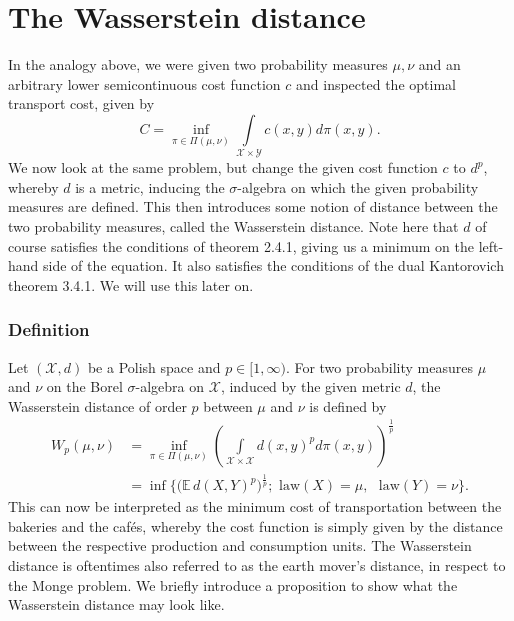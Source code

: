 \documentclass[11pt,a4paper]{article}
\begin{document}
\section{The Wasserstein distance}
In the analogy above, we were given two probability measures $\mu, \nu$ and an arbitrary lower semicontinuous cost function $c$ and inspected the optimal transport cost, given by 
\[
C=\inf\limits_{\pi\in\Pi(\mu,\nu)}\int\limits_{\mathcal{X\times{}Y}}c(x,y)d\pi(x,y).
\]
We now look at the same problem, but change the given cost function $c$ to $d^p$, whereby $d$ is a metric, inducing the $\sigma$-algebra on which the given probability measures are defined. This then introduces some notion of distance between the two probability measures, called the Wasserstein distance. Note here that $d$ of course satisfies the conditions of theorem 2.4.1, giving us a minimum on the left-hand side of the equation. It also satisfies the conditions of the dual Kantorovich theorem 3.4.1. We will use this later on.
\subsubsection{Definition}
Let $(\mathcal{X},d)$ be a Polish space and $p\in[1,\infty)$. For two probability measures $\mu$ and $\nu$ on the Borel $\sigma$-algebra on $\mathcal{X}$, induced by the given metric $d$, the Wasserstein distance of order $p$ between $\mu$ and $\nu$ is defined by
\begin{align*}
W_p(\mu,\nu) & = \inf_{\pi\in\Pi(\mu,\nu)}\left(\int\limits_{\mathcal{X\times{}X}}d(x,y)^pd\pi(x,y)\right)^{\frac{1}{p}} \\[12pt]& = \inf\bigg\lbrace\Big(\mathbb{E}\,d(X,Y)^p\Big)^{\frac{1}{p}}; \text{ law}(X) = \mu,\,\, \text{ law}(Y) = \nu\bigg\rbrace.
\end{align*}
This can now be interpreted as the minimum cost of transportation between the bakeries and the cafés, whereby the cost function is simply given by the distance between the respective production and consumption units. The Wasserstein distance is oftentimes also referred to as the earth mover's distance, in respect to the Monge problem. We briefly introduce a proposition to show what the Wasserstein distance may look like. 
\end{document}
